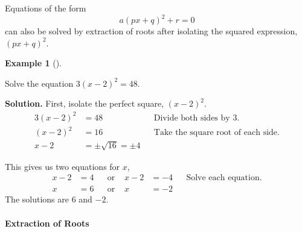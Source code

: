 \documentclass[10pt,]{book}
\theoremstyle{plain}
\theoremstyle{definition}
\theoremstyle{definition}
\newtheorem{example}[theorem]{Example}
\theoremstyle{definition}
\newcommand{\amp}{ & }
\begin{document}
    Equations of the form
    \begin{equation*}a( px + q)^2 + r = 0\end{equation*}
    can also be solved by extraction of roots after isolating the squared expression, \((px + q)^2\).
%
\begin{example}[]\label{example-extracting-roots}

    Solve the equation \(3(x − 2)^2 = 48\).
%
\par\medskip\noindent%
\textbf{Solution.}\quad 
    First, isolate the perfect square, \((x − 2)^2\).
    \begin{equation*}
        \begin{aligned}
        3(x − 2)^2 \amp = 48 \amp\amp\text{Divide both sides by }3.\\
        (x − 2)^2 \amp = 16 \amp\amp\text{Take the square root of each side.}\\
        x − 2 \amp = \pm\sqrt{16} = \pm 4
        \end{aligned}
    \end{equation*}
    
    This gives us two equations for \(x\), 
    \begin{equation*}
        \begin{aligned}
        x − 2 \amp =4 \amp\amp \text{or }\amp x − 2 \amp =−4\amp\amp\text {Solve each equation.}\\
        x \amp=6 \amp\amp \text{or }\amp x \amp =−2
        \end{aligned}
    \end{equation*}
        The solutions are \(6\) and \(−2\).
\end{example}
\typeout{************************************************}
\typeout{************************************************}
\paragraph[Extraction of Roots]{Extraction of Roots}\label{paragraphs-2}
\end{document}
